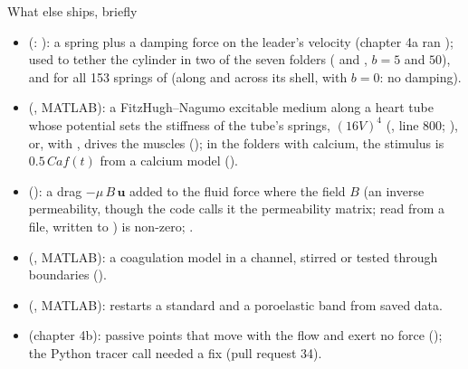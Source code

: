 \documentclass[aspectratio=169,11pt]{beamer}
\begin{document}
\begin{frame}{What else ships, briefly}
\label{fr:else}
\footnotesize
\begin{itemize}
  \item {} (: ): a spring plus a damping force on the leader's velocity (chapter 4a ran ); used to tether the cylinder in two of the seven  folders ( and , $b = 5$ and $50$), and for all 153 springs of  (along and across its shell, with $b = 0$: no damping).
  \item {} (, MATLAB): a FitzHugh--Nagumo excitable medium along a heart tube whose potential sets the stiffness of the tube's springs, $(16V)^4$ (, line 800; ), or, with , drives the muscles (); in the folders with calcium, the stimulus is $0.5\,Caf(t)$ from a calcium model ().
  \item {} (): a drag $-\mu\,B\,\mathbf{u}$ added to the fluid force where the field $B$ (an inverse permeability, though the code calls it the permeability matrix; read from a file, written to ) is non-zero; .
  \item {} (, MATLAB): a coagulation model in a channel, stirred or tested through boundaries ().
  \item {} (, MATLAB):  restarts a standard and a poroelastic band from saved data.
  \item {} (chapter 4b): passive points that move with the flow and exert no force (); the Python tracer call needed a fix (pull request 34).
\end{itemize}
\end{frame}
\end{document}
